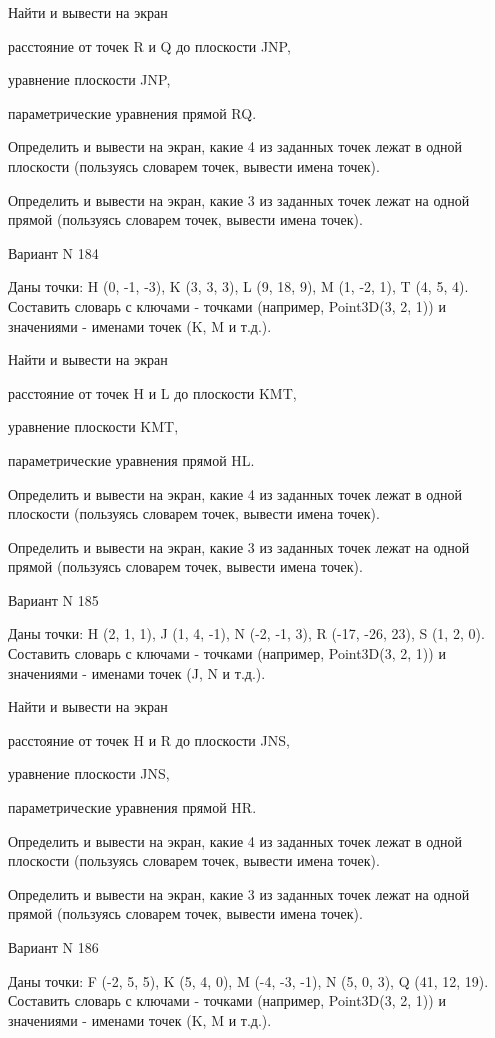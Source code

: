 \documentclass[11pt]{report}
\begin{document}
Найти и вывести на экран


расстояние от точек R и Q до плоскости JNP,


уравнение плоскости JNP,


параметрические уравнения прямой RQ.


Определить и вывести на экран, какие 4 из заданных точек лежат в одной плоскости (пользуясь словарем точек, вывести имена точек).


Определить и вывести на экран, какие 3 из заданных точек лежат на одной прямой (пользуясь словарем точек, вывести имена точек).

\newpage
Вариант N 184

Даны точки: H (0, -1, -3), K (3, 3, 3), L (9, 18, 9), M (1, -2, 1), T (4, 5, 4).
Составить словарь с ключами - точками (например, Point3D(3, 2, 1)) и значениями - именами точек (K, M и т.д.).


Найти и вывести на экран


расстояние от точек H и L до плоскости KMT,


уравнение плоскости KMT,


параметрические уравнения прямой HL.


Определить и вывести на экран, какие 4 из заданных точек лежат в одной плоскости (пользуясь словарем точек, вывести имена точек).


Определить и вывести на экран, какие 3 из заданных точек лежат на одной прямой (пользуясь словарем точек, вывести имена точек).

\newpage
Вариант N 185

Даны точки: H (2, 1, 1), J (1, 4, -1), N (-2, -1, 3), R (-17, -26, 23), S (1, 2, 0).
Составить словарь с ключами - точками (например, Point3D(3, 2, 1)) и значениями - именами точек (J, N и т.д.).


Найти и вывести на экран


расстояние от точек H и R до плоскости JNS,


уравнение плоскости JNS,


параметрические уравнения прямой HR.


Определить и вывести на экран, какие 4 из заданных точек лежат в одной плоскости (пользуясь словарем точек, вывести имена точек).


Определить и вывести на экран, какие 3 из заданных точек лежат на одной прямой (пользуясь словарем точек, вывести имена точек).

\newpage
Вариант N 186

Даны точки: F (-2, 5, 5), K (5, 4, 0), M (-4, -3, -1), N (5, 0, 3), Q (41, 12, 19).
Составить словарь с ключами - точками (например, Point3D(3, 2, 1)) и значениями - именами точек (K, M и т.д.).
\end{document}

